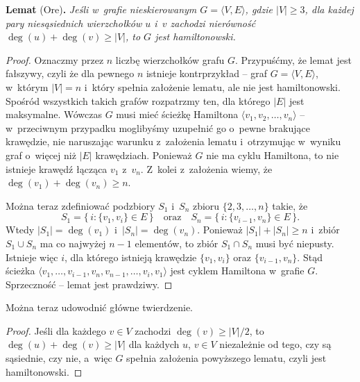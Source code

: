 \medskip
\noindent\textsf{\textbf{Lemat} (Ore)\textbf{.}} \textit{Jeśli w~grafie nieskierowanym\/ $G=\langle V,E\rangle$, gdzie\/ $|V|\ge3$, dla każdej pary niesąsiednich wierzchołków\/ $u$ i\/~$v$ zachodzi nierówność\/ $\deg(u)+\deg(v)\ge|V|$, to\/ $G$ jest hamiltonowski.}
\begin{proof}
Oznaczmy przez $n$ liczbę wierzchołków grafu $G$.
Przypuśćmy, że lemat jest fałszywy, czyli że dla pewnego $n$ istnieje kontrprzykład -- graf $G=\langle V,E\rangle$, w~którym $|V|=n$ i~który spełnia założenie lematu, ale nie jest hamiltonowski.
Spośród wszystkich takich grafów rozpatrzmy ten, dla którego $|E|$ jest maksymalne.
Wówczas $G$ musi mieć ścieżkę Hamiltona $\langle v_1,v_2,\dots,v_n\rangle$ -- w~przeciwnym przypadku moglibyśmy uzupełnić go o~pewne brakujące krawędzie, nie naruszając warunku z~założenia lematu i~otrzymując w~wyniku graf o~więcej niż $|E|$ krawędziach.
Ponieważ $G$ nie ma cyklu Hamiltona, to nie istnieje krawędź łącząca $v_1$ z~$v_n$.
Z~kolei z~założenia wiemy, że $\deg(v_1)+\deg(v_n)\ge n$.

Można teraz zdefiniować podzbiory $S_1$ i~$S_n$ zbioru $\{2,3,\dots,n\}$ takie, że
\[
	S_1 = \bigl\{\,i:\{v_1,v_i\}\in E\,\bigr\} \quad\text{oraz}\quad S_n = \bigl\{\,i:\{v_{i-1},v_n\}\in E\,\bigr\}.
\]
Wtedy $|S_1|=\deg(v_1)$ i~$|S_n|=\deg(v_n)$.
Ponieważ $|S_1|+|S_n|\ge n$ i~zbiór $S_1\cup S_n$ ma co najwyżej $n-1$ elementów, to zbiór $S_1\cap S_n$ musi być niepusty.
Istnieje więc $i$, dla którego istnieją krawędzie $\{v_1,v_i\}$ oraz $\{v_{i-1},v_n\}$.
Stąd ścieżka $\langle v_1,\dots,v_{i-1},v_n,v_{n-1},\dots,v_i,v_1\rangle$ jest cyklem Hamiltona w~grafie $G$.
Sprzeczność -- lemat jest prawdziwy.
\end{proof}

Można teraz udowodnić główne twierdzenie.
\begin{proof}
Jeśli dla każdego $v\in V$ zachodzi $\deg(v)\ge|V|/2$, to $\deg(u)+\deg(v)\ge|V|$ dla każdych $u$, $v\in V$ niezależnie od tego, czy są sąsiednie, czy nie, a~więc $G$ spełnia założenia powyższego lematu, czyli jest hamiltonowski.
\end{proof}
